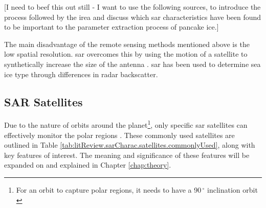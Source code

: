 [I need to beef this out still - I want to use the following sources, \cite{Dierking2013,Zakhvatkina2019,Thomas2017Chap9} to introduce the process followed by the \acs{irea} and discuss which \acs{sar} characteristics have been found to be important to the parameter extraction process of pancake ice.]

The main disadvantage of the remote sensing methods mentioned above is the low spatial resolution. \acs{sar} overcomes this by using the motion of a satellite to synthetically increase the size of the antenna \cite{Thomas2017Chap9}. \acs{sar} has been used to determine sea ice type through differences in radar backscatter. 

\subsection{SAR Satellites}
\label{subsec:litReview.sarCharac.satellites}

Due to the nature of orbits around the planet\footnote{For an orbit to capture polar regions, it needs to have a 90\,$^{\circ}$ inclination orbit \cite{PolarOrbitNasa}}, only specific \acs{sar} satellites can effectively monitor the polar regions \cite{Thomas2017Chap9}. These commonly used satellites are outlined in Table \ref{tab:litReview.sarCharac.satellites.commonlyUsed}, along with key features of interest. The meaning and significance of these features will be expanded on and explained in Chapter \ref{chap:theory}.

